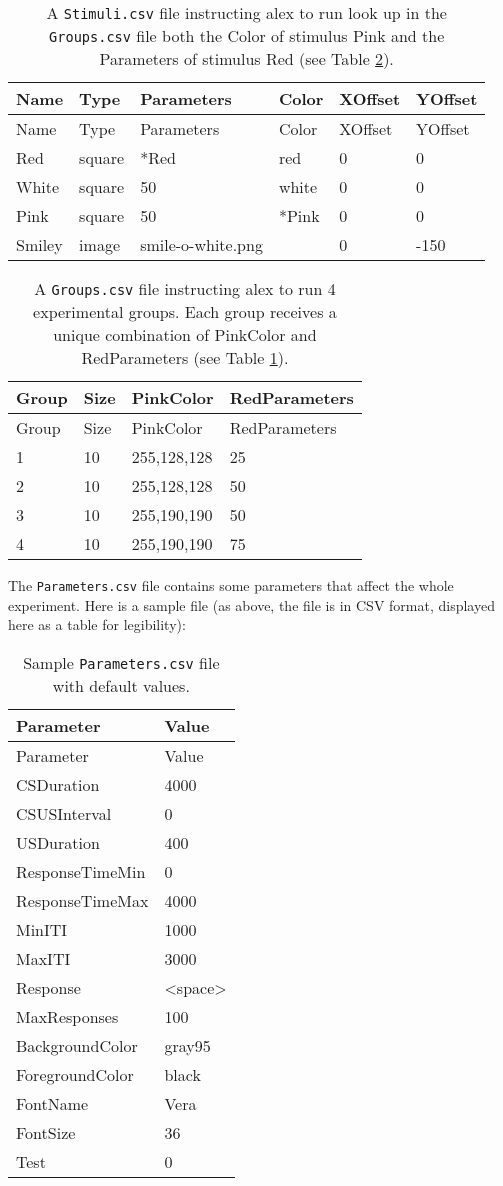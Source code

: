 \documentclass[11pt,]{article}
\begin{document}
\begin{longtable}[c]{@{}llllll@{}}
\caption{A \texttt{Stimuli.csv} file instructing alex to run look up in
the \texttt{Groups.csv} file both the Color of stimulus Pink and the
Parameters of stimulus Red (see Table \ref{subjects-color-parameters}).
\label{stimuli-color-parameters}}\tabularnewline
\toprule
Name & Type & Parameters & Color & XOffset & YOffset\tabularnewline
\midrule
\endfirsthead
\toprule
Name & Type & Parameters & Color & XOffset & YOffset\tabularnewline
\midrule
\endhead
Red & square & *Red & red & 0 & 0\tabularnewline
White & square & 50 & white & 0 & 0\tabularnewline
Pink & square & 50 & *Pink & 0 & 0\tabularnewline
Smiley & image & smile-o-white.png & & 0 & -150\tabularnewline
\bottomrule
\end{longtable}

\begin{longtable}[c]{@{}llll@{}}
\caption{A \texttt{Groups.csv} file instructing alex to run 4
experimental groups. Each group receives a unique combination of
PinkColor and RedParameters (see Table \ref{stimuli-color-parameters}).
\label{subjects-color-parameters}}\tabularnewline
\toprule
Group & Size & PinkColor & RedParameters\tabularnewline
\midrule
\endfirsthead
\toprule
Group & Size & PinkColor & RedParameters\tabularnewline
\midrule
\endhead
1 & 10 & 255,128,128 & 25\tabularnewline
2 & 10 & 255,128,128 & 50\tabularnewline
3 & 10 & 255,190,190 & 50\tabularnewline
4 & 10 & 255,190,190 & 75\tabularnewline
\bottomrule
\end{longtable}


The \texttt{Parameters.csv} file contains some parameters that affect
the whole experiment. Here is a sample file (as above, the file is in
CSV format, displayed here as a table for legibility):

\begin{longtable}[c]{@{}ll@{}}
\caption{Sample \texttt{Parameters.csv} file with default
values.}\tabularnewline
\toprule
Parameter & Value\tabularnewline
\midrule
\endfirsthead
\toprule
Parameter & Value\tabularnewline
\midrule
\endhead
CSDuration & 4000\tabularnewline
CSUSInterval & 0\tabularnewline
USDuration & 400\tabularnewline
ResponseTimeMin & 0\tabularnewline
ResponseTimeMax & 4000\tabularnewline
MinITI & 1000\tabularnewline
MaxITI & 3000\tabularnewline
Response & \textless{}space\textgreater{}\tabularnewline
MaxResponses & 100\tabularnewline
BackgroundColor & gray95\tabularnewline
ForegroundColor & black\tabularnewline
FontName & Vera\tabularnewline
FontSize & 36\tabularnewline
Test & 0\tabularnewline
\bottomrule
\end{longtable}
\end{document}
